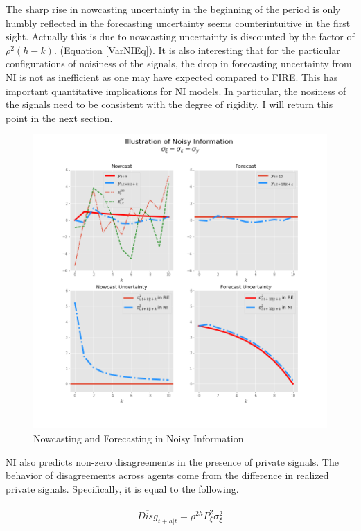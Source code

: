 \documentclass[]{article}
\begin{document}
	The sharp rise in nowcasting uncertainty in the beginning of the period is only humbly reflected in the forecasting uncertainty seems counterintuitive in the first sight. Actually this is due to nowcasting uncertainty is discounted by the factor of $\rho^2(h-k)$.  (Equation \ref{VarNIEq}). It is also interesting that for the particular configurations of noisiness of the signals, the drop in forecasting uncertainty from NI is not as inefficient as one may have expected compared to FIRE.  This has important quantitative implications for NI models. In particular, the nosiness of the signals need to be consistent with the degree of rigidity. I will return this point in the next section.  
	
	\begin{figure}[ht]
		\centering
		\includegraphics[width=13cm]{figures/ni_illustration.png}  
		\caption{Nowcasting and Forecasting in Noisy Information}
		\label{IllustrateNI}
	\end{figure}
	
	NI also predicts non-zero disagreements in the presence of private signals. The behavior of disagreements across agents come from the difference in realized private signals. Specifically, it is equal to the following. 
	
	\begin{eqnarray}
		\begin{aligned}
			\overline {Disg}_{t+h|t} = \rho^{2h} P^2_\xi \sigma^2_\xi  
		\end{aligned}
	\end{eqnarray}
	
\end{document}
